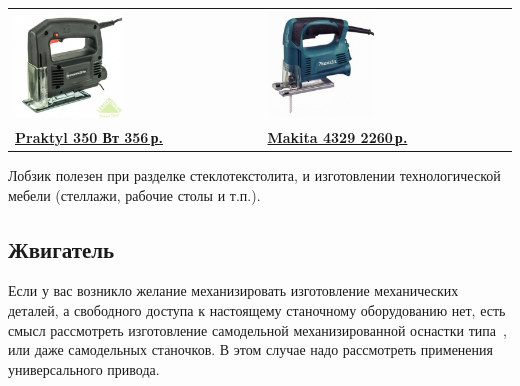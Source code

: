 \noindent
\begin{tabular}{p{} p{}}
\noindent
\includegraphics[width=0.45\textwidth]{tech/tools/LobzPraktyl.jpg}
&
\noindent
\includegraphics[width=0.45\textwidth]{tech/tools/LobzMakita4329.jpg}
\\
\href{http://leroymerlin.ru/catalogue/instrumenty/elektroinstrument/lobziki/13805991/}{\textbf{Praktyl
350 Вт 356\,р.}} 
& 
\href{http://leroymerlin.ru/catalogue/instrumenty/elektroinstrument/lobziki/12114283/}{\textbf{Makita
4329 2260\,р.}}
\\
\end{tabular}
\bigskip

Лобзик полезен при разделке стеклотекстолита, и изготовлении технологической
мебели (стеллажи, рабочие столы и т.п.).

\subsection{Жвигатель}

Если у вас возникло желание механизировать изготовление механических деталей, а
свободного доступа к настоящему станочному оборудованию нет, есть смысл
рассмотреть изготовление самодельной механизированной оснастки 
типа\ , или даже самодельных станочков. В этом случае надо
рассмотреть применения универсального привода.

